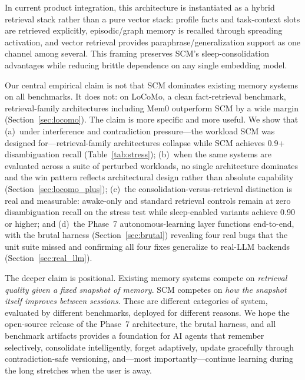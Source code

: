 \documentclass[11pt,twocolumn]{article}
\begin{document}
In current product integration, this architecture is instantiated as a hybrid retrieval stack rather than a pure vector stack: profile facts and task-context slots are retrieved explicitly, episodic/graph memory is recalled through spreading activation, and vector retrieval provides paraphrase/generalization support as one channel among several. This framing preserves SCM's sleep-consolidation advantages while reducing brittle dependence on any single embedding model.

Our central empirical claim is not that SCM dominates existing memory systems on all benchmarks. It does not: on LoCoMo, a clean fact-retrieval benchmark, retrieval-family architectures including Mem0 outperform SCM by a wide margin (Section~\ref{sec:locomo}). The claim is more specific and more useful. We show that (a)~under interference and contradiction pressure---the workload SCM was designed for---retrieval-family architectures collapse while SCM achieves 0.9+ disambiguation recall (Table~\ref{tab:stress}); (b)~when the same systems are evaluated across a suite of perturbed workloads, no single architecture dominates and the win pattern reflects architectural design rather than absolute capability (Section~\ref{sec:locomo_plus}); (c)~the consolidation-versus-retrieval distinction is real and measurable: awake-only and standard retrieval controls remain at zero disambiguation recall on the stress test while sleep-enabled variants achieve 0.90 or higher; and (d)~the Phase~7 autonomous-learning layer functions end-to-end, with the brutal harness (Section~\ref{sec:brutal}) revealing four real bugs that the unit suite missed and confirming all four fixes generalize to real-LLM backends (Section~\ref{sec:real_llm}).

The deeper claim is positional. Existing memory systems compete on \emph{retrieval quality given a fixed snapshot of memory}. SCM competes on \emph{how the snapshot itself improves between sessions}. These are different categories of system, evaluated by different benchmarks, deployed for different reasons. We hope the open-source release of the Phase~7 architecture, the brutal harness, and all benchmark artifacts provides a foundation for AI agents that remember selectively, consolidate intelligently, forget adaptively, update gracefully through contradiction-safe versioning, and---most importantly---continue learning during the long stretches when the user is away.
\end{document}
